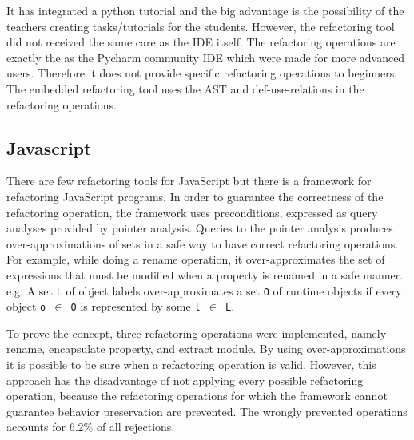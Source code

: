 It has integrated a python tutorial and the big advantage is the possibility of
the teachers creating tasks/tutorials for the students.
However, the refactoring tool did not received the same care as the IDE itself.
The refactoring operations are exactly the as the Pycharm community IDE which were made
for more advanced users.
Therefore it does not provide specific refactoring operations to beginners.
The embedded refactoring tool uses the AST and def-use-relations in the refactoring
operations.

\subsection{Javascript}
There are few refactoring tools for JavaScript but there is a framework
\cite{feldthaus2011tool} for refactoring JavaScript programs. %
In order to guarantee the correctness of the refactoring operation, the framework
uses preconditions, expressed as query analyses provided by pointer analysis. %
Queries to the pointer analysis produces over-approximations of sets in a safe way to
have correct refactoring operations.
For example, while doing a rename operation, it over-approximates the set of expressions
that must be modified when a property is renamed in a safe manner.
e.g: A set {\tt L} of object labels over-approximates a set {\tt O} of runtime objects if every
object {\tt o $\in$ O} is represented by some {\tt l $\in$ L}.

To prove the concept, three refactoring operations were implemented, namely rename,
encapsulate property, and extract module.
By using over-approximations it is possible to be sure when a refactoring
operation is valid.
However, this approach has the disadvantage of not applying every possible refactoring operation,
because the refactoring operations for which the framework cannot guarantee behavior
preservation are prevented.
The wrongly prevented operations accounts for 6.2\% of all rejections.
